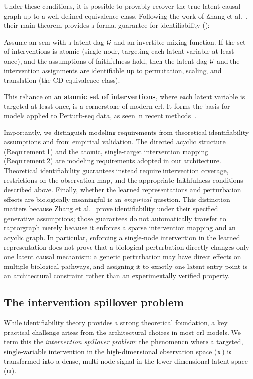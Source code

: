 Under these conditions, it is possible to provably recover the true latent causal graph up to a well-defined equivalence class.
Following the work of Zhang et al.~\cite{zhang2023identifiability}, their main theorem provides a formal guarantee for identifiability ():

\begin{theorem}\label{thm:zhang_full_dag}
Assume an \gls{scm} with a latent \gls{dag} ${\mathcal{G}}$ and an invertible mixing function.
If the set of interventions is atomic (single-node, targeting each latent variable at least once), and the assumptions of faithfulness hold, then the latent \gls{dag} ${\mathcal{G}}$ and the intervention assignments are identifiable up to permutation, scaling, and translation (the CD-equivalence class).
\end{theorem}

This reliance on an \textbf{atomic set of interventions}, where each latent variable is targeted at least once, is a cornerstone of modern \gls{crl}.
It forms the basis for models applied to Perturb-seq data, as seen in recent methods~\cite{zhang2023identifiability,de2025interpretable}.

Importantly, we distinguish modeling requirements from theoretical identifiability assumptions and from empirical validation.
The directed acyclic structure (Requirement 1) and the atomic, single-target intervention mapping (Requirement 2) are modeling requirements adopted in our architecture.
Theoretical identifiability guarantees instead require intervention coverage, restrictions on the observation map, and the appropriate faithfulness conditions described above.
Finally, whether the learned representations and perturbation effects are biologically meaningful is an \emph{empirical} question.
This distinction matters because Zhang et al.~\cite{zhang2023identifiability} prove identifiability under their specified generative assumptions; those guarantees do not automatically transfer to \gls{raptorgraph} merely because it enforces a sparse intervention mapping and an acyclic graph.
In particular, enforcing a single-node intervention in the learned representation does not prove that a biological perturbation directly changes only one latent causal mechanism: a genetic perturbation may have direct effects on multiple biological pathways, and assigning it to exactly one latent entry point is an architectural constraint rather than an experimentally verified property.

\subsection*{The intervention spillover problem}
While identifiability theory provides a strong theoretical foundation, a key practical challenge arises from the architectural choices in most \gls{crl} models.
We term this the \emph{intervention spillover problem}: the phenomenon where a targeted, single-variable intervention in the high-dimensional observation space (${\mathbf{x}}$) is transformed into a dense, multi-node signal in the lower-dimensional latent space (${\mathbf{u}}$).


